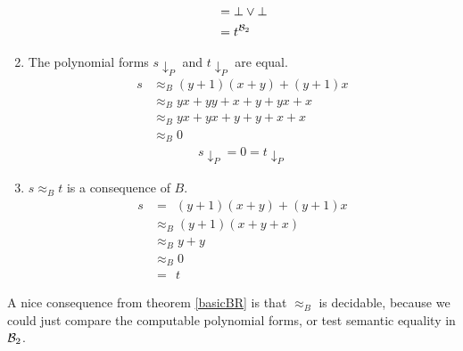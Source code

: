 \begin{enumerate}
\begin{align*}
				& =\bot\vee\bot\\
				& =t^{\mathcal{B}_2} 
			\end{align*}
			\item The polynomial forms $s{\downarrow_P}$ and $t{\downarrow_P}$ are equal.
			\begin{align*}
				s & \approx_B (y+1)(x+y)+(y+1)x \\
				  & \approx_B yx+yy+x+y+yx+x    \\
				  & \approx_B yx+yx+y+y+x+x     \\
				  & \approx_B 0
			\end{align*}
			\begin{align*}
				s{\downarrow_P}=0=t{\downarrow_P}
			\end{align*}
			\item $s\approx_B t$ is a consequence of $B$.
			\begin{align*}
				s & =\ \ (y+1)(x+y)+(y+1)x \\
				  & \approx_B (y+1)(x+y+x)      \\
				  & \approx_B y+y               \\
				  & \approx_B 0                 \\
				  & =\ \ t                 
			\end{align*}
		\end{enumerate}
		A nice consequence from theorem \ref{basicBR} is that $\approx_B$ is decidable, because we could just compare the computable polynomial forms, or test semantic equality in ${\mathcal{B}_2}$.
